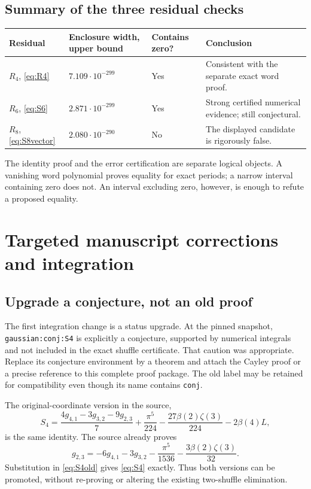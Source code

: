 \documentclass[11pt,letterpaper]{article}
\numberwithin{equation}{section}
\theoremstyle{definition}
\begin{document}
\subsection{Summary of the three residual checks}
\begin{center}
\begin{tabular}{@{}p{}p{}p{}p{}@{}}
\toprule
Residual&Enclosure width, upper bound&Contains zero?&Conclusion\\
\midrule
$R_4$, \eqref{eq:R4}&$7.109\cdot10^{-299}$&Yes&Consistent with the separate exact word proof.\\[4pt]
$R_6$, \eqref{eq:S6}&$2.871\cdot10^{-299}$&Yes&Strong certified numerical evidence; still conjectural.\\[4pt]
$R_8$, \eqref{eq:S8vector}&$2.080\cdot10^{-290}$&No&The displayed candidate is rigorously false.\\
\bottomrule
\end{tabular}
\end{center}
The identity proof and the error certification are separate logical
objects. A vanishing word polynomial proves equality for exact periods;
a narrow interval containing zero does not. An interval excluding zero,
however, is enough to refute a proposed equality.

\section{Targeted manuscript corrections and integration}
\label{sec:corrections}

\subsection{Upgrade a conjecture, not an old proof}
The first integration change is a status upgrade. At the pinned snapshot,
\texttt{gaussian:conj:S4} is explicitly a conjecture, supported by numerical
integrals and not included in the exact shuffle certificate. That caution
was appropriate. Replace its conjecture environment by a theorem and
attach the Cayley proof or a precise reference to this complete proof
package. The old label may be retained for compatibility even though its
name contains \texttt{conj}.

The original-coordinate version in the source,
\begin{equation}
 S_4=\frac{4g_{4,1}-3g_{3,2}-9g_{2,3}}7
       +\frac{\pi^5}{224}-\frac{27\beta(2)\zeta(3)}{224}
       -2\beta(4)L,
 \label{eq:S4old}
\end{equation}
is the same identity. The source already proves
\[
 g_{2,3}=-6g_{4,1}-3g_{3,2}-\frac{\pi^5}{1536}
                         -\frac{3\beta(2)\zeta(3)}{32}.
\]
Substitution in \eqref{eq:S4old} gives \eqref{eq:S4} exactly. Thus both
versions can be promoted, without re-proving or altering the existing
two-shuffle elimination.
\end{document}

